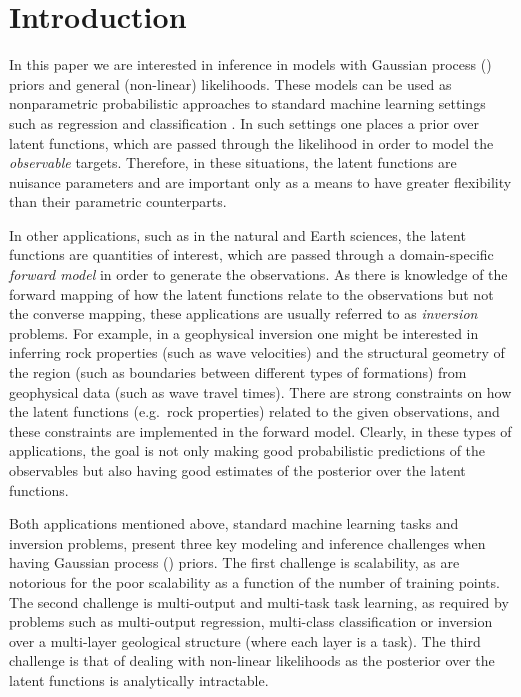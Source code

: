 \section{Introduction}
% 
In this paper we are interested in inference in models with Gaussian process (\gp)
priors and  general (non-linear) likelihoods. These models can be used as   
nonparametric probabilistic approaches to standard machine learning settings such as 
regression and classification \cite{rasmussen-williams-book}. In such settings 
one places a  \gp prior over  latent functions, which are passed through the 
likelihood in order to model the \emph{observable} targets.  Therefore, in these 
situations, the latent functions are nuisance parameters and are important only 
as a means to have greater flexibility than their parametric counterparts.

In other applications, such as in the natural and Earth sciences, the latent functions 
are quantities of interest,  which are passed through a domain-specific \emph{forward model}
in order to generate the observations.  As there is knowledge of the forward mapping of 
how the latent functions relate to the observations but not the converse mapping, these
applications are usually referred to as \emph{inversion} problems.
For example, in a geophysical inversion one might be interested in inferring rock properties (such as wave velocities) 
and the structural geometry of the  region   (such as boundaries between 
different types of formations) from geophysical data (such as wave travel times). 
There are strong constraints on how the latent functions (e.g.~rock properties) related
 to the given observations, and these constraints are implemented in the forward model. 
 Clearly, in these types of applications, the goal is not only making good probabilistic predictions of the 
 observables but also having good estimates of the posterior over  the latent functions.

Both applications mentioned above,  standard machine learning tasks and inversion problems, 
present three key modeling and inference challenges when having Gaussian process (\gp) priors. 
The first challenge is scalability, as  are notorious for the poor scalability as a function 
of the number of training points. The second challenge is multi-output and multi-task task learning, 
as required by problems such as multi-output regression, multi-class classification 
or inversion over a multi-layer geological structure (where each layer is a task). 
The  third challenge is that of dealing with non-linear likelihoods as the posterior 
over the latent functions is analytically intractable.  

